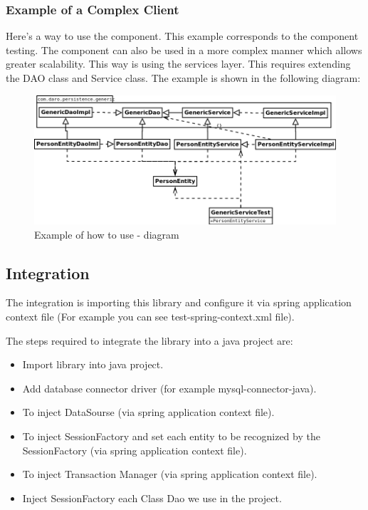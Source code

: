 \documentclass[a4paper,11pt]{book}
\begin{document}
\pagebreak
\subsubsection{Example of a Complex Client}
Here's a way to use the component. This example corresponds to the component testing.
The component can also be used in a more complex manner which allows greater scalability. 
This way is using the services layer. This requires extending the DAO class and Service class.
The example is shown in the following diagram:

\begin{figure}[h] %
  \includegraphics[width=\textwidth]{generic_persistence_class_diagram_to_use}
  \caption{Example of how to use - diagram}
  \centering
  \label{fig:generic_persistence_class_diagram_to_use} %
\end{figure}

\pagebreak
\subsection{Integration}
The integration is importing this library and configure it via spring application context file (For example you can see test-spring-context.xml file).

The steps required to integrate the library into a java project are:

\begin{itemize}
\item Import library into java project.
\item Add database connector driver (for example mysql-connector-java).
\item To inject DataSourse (via spring application context file).
\item To inject SessionFactory and set each entity to be recognized by the SessionFactory (via spring application context file).
\item To inject Transaction Manager (via spring application context file).
\item Inject SessionFactory each Class Dao we use in the project.
\end{itemize}
\end{document}
